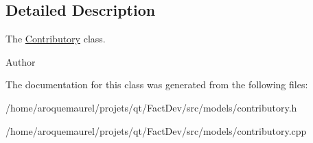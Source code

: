 \subsection{Detailed Description}
The \hyperlink{classContributory}{Contributory} class. 

\begin{DoxyAuthor}{Author}

\end{DoxyAuthor}


The documentation for this class was generated from the following files\-:\begin{DoxyCompactItemize}
\item 
/home/aroquemaurel/projets/qt/\-Fact\-Dev/src/models/contributory.\-h\item 
/home/aroquemaurel/projets/qt/\-Fact\-Dev/src/models/contributory.\-cpp\end{DoxyCompactItemize}
